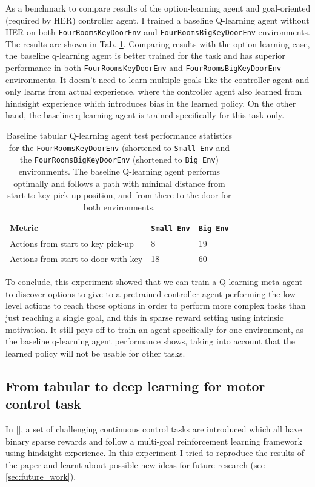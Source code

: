 \documentclass[conference]{IEEEtran}
\begin{document}
As a benchmark to compare results of the option-learning agent and goal-oriented (required by HER) controller agent, I trained a baseline Q-learning agent without HER on both \texttt{FourRoomsKeyDoorEnv} and \texttt{FourRoomsBigKeyDoorEnv} environments. The results are shown in Tab. \ref{tab:exp_baseline_tabular_qlearning}. Comparing results with the option learning case, the baseline q-learning agent is better trained for the task and has superior performance in both \texttt{FourRoomsKeyDoorEnv} and \texttt{FourRoomsBigKeyDoorEnv} environments. It doesn't need to learn multiple goals like the controller agent and only learns from actual experience, where the controller agent also learned from hindsight experience which introduces bias in the learned policy. On the other hand, the baseline q-learning agent is trained specifically for this task only.

\begin{table}[ht]
\centering
\begin{tabular}{|l|l|l|}
  \hline
  Metric & \texttt{Small Env} & \texttt{Big Env} \\
  \hline
  Actions from start to key pick-up   & 8 & 19 \\
  Actions from start to door with key & 18 & 60 \\
  \hline
\end{tabular}
\caption{Baseline tabular Q-learning agent test performance statistics for the \texttt{FourRoomsKeyDoorEnv} (shortened to \texttt{Small Env} and the \texttt{FourRoomsBigKeyDoorEnv} (shortened to \texttt{Big Env}) environments. The baseline Q-learning agent performs optimally and follows a path with minimal distance from start to key pick-up position, and from there to the door for both environments.}
\label{tab:exp_baseline_tabular_qlearning}
\end{table}

To conclude, this experiment showed that we can train a Q-learning meta-agent to discover options to give to a pretrained controller agent performing the low-level actions to reach those options in order to perform more complex tasks than just reaching a single goal, and this in sparse reward setting using intrinsic motivation. It still pays off to train an agent specifically for one environment, as the baseline q-learning agent performance shows, taking into account that the learned policy will not be usable for other tasks.

\subsection{From tabular to deep learning for motor control task}
In [\cite{plappert2018multi}], a set of challenging continuous control tasks are introduced which all have binary sparse rewards and follow a multi-goal reinforcement learning framework using hindsight experience. In this experiment I tried to reproduce the results of the paper and learnt about possible new ideas for future research (see \ref{sec:future_work}). 
\end{document}
